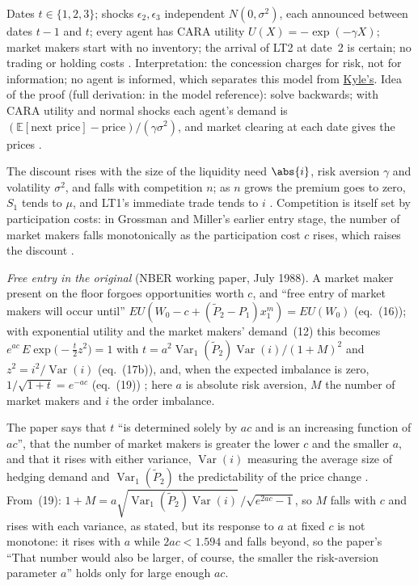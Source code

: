 \begin{qfmodel}
 Dates $t\in\{1,2,3\}$; shocks $\epsilon_2,\epsilon_3$ independent $N(0,\sigma^2)$, each announced between dates $t-1$ and $t$; every agent has CARA utility $U(X)=-\exp(-\gamma X)$; market makers start with no inventory; the arrival of LT2 at date~2 is certain; no trading or holding costs \citep[same chap., p.~21]{crypto-cartea}. Interpretation: the concession charges for risk, not for information; no agent is informed, which separates this model from \hyperref[mod:kyle-single-auction]{Kyle's}. Idea of the proof (full derivation:  in the model reference): solve backwards; with CARA utility and normal shocks each agent's demand is $(\mathbb{E}[\text{next price}]-\text{price})/(\gamma\sigma^2)$, and market clearing at each date gives the prices \citep[same chap., pp.~22--23]{crypto-cartea}.

 The discount rises with the size of the liquidity need $\abs{i}$, risk aversion $\gamma$ and volatility $\sigma^2$, and falls with competition $n$; as $n$ grows the premium goes to zero, $S_1$ tends to $\mu$, and LT1's immediate trade tends to $i$ \citep[same chap., p.~24]{crypto-cartea}. Competition is itself set by participation costs: in Grossman and Miller's earlier entry stage, the number of market makers falls monotonically as the participation cost $c$ rises, which raises the discount \citep[same chap., p.~25]{crypto-cartea}.

\emph{Free entry in the original} (NBER working paper, July 1988). A market maker present on the floor forgoes opportunities worth $c$, and ``free entry of market makers will occur until'' $EU(W_0-c+(\tilde P_2-P_1)x_1^m)=EU(W_0)$ (eq.~(16)); with exponential utility and the market makers' demand~(12) this becomes $e^{ac}\,E\exp\big(-\tfrac{t}{2}z^2\big)=1$ with $t=a^2\operatorname{Var}_1(\tilde P_2)\operatorname{Var}(i)/(1+M)^2$ and $z^2=i^2/\operatorname{Var}(i)$ (eq.~(17b)), and, when the expected imbalance is zero, $1/\sqrt{1+t}=e^{-ac}$ (eq.~(19)) \citep[eqs.~(16)--(19), printed p.~18]{grossman-miller-1988-nber}; here $a$ is absolute risk aversion, $M$ the number of market makers and $i$ the order imbalance.

The paper says that $t$ ``is determined solely by $ac$ and is an increasing function of $ac$'', that the number of market makers is greater the lower $c$ and the smaller $a$, and that it rises with either variance, $\operatorname{Var}(i)$ measuring the average size of hedging demand and $\operatorname{Var}_1(\tilde P_2)$ the predictability of the price change \citep[printed p.~19]{grossman-miller-1988-nber}. From~(19): $1+M=a\sqrt{\operatorname{Var}_1(\tilde P_2)\operatorname{Var}(i)}\,/\sqrt{e^{2ac}-1}$, so $M$ falls with $c$ and rises with each variance, as stated, but its response to $a$ at fixed $c$ is not monotone: it rises with $a$ while $2ac<1.594$ and falls beyond, so the paper's ``That number would also be larger, of course, the smaller the risk-aversion parameter $a$'' holds only for large enough $ac$.


\end{qfmodel}
